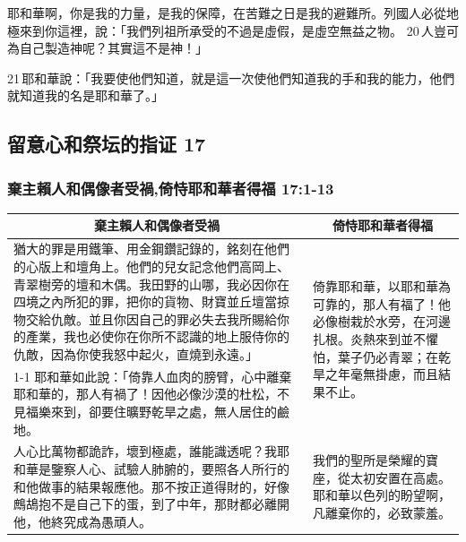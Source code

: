 耶和華啊，你是我的力量，是我的保障，在苦難之日是我的避難所。列國人必從地極來到你這裡，說：「我們列祖所承受的不過是虛假，是虛空無益之物。 20 人豈可為自己製造神呢？其實這不是神！」

21 耶和華說：「我要使他們知道，就是這一次使他們知道我的手和我的能力，他們就知道我的名是耶和華了。」


\subsection{留意心和祭坛的指证 17}
\subsubsection{棄主賴人和偶像者受禍,倚恃耶和華者得福 17:1-13}
\begin{table}[H]
\centering
\begin{tabular}{p{11.75cm}|p{5.50cm}}\hline\hline
\multicolumn{1}{c|}{棄主賴人和偶像者受禍}&\multicolumn{1}{c}{倚恃耶和華者得福}\\\hline
猶大的罪是用鐵筆、用金鋼鑽記錄的，銘刻在他們的心版上和壇角上。他們的兒女記念他們高岡上、青翠樹旁的壇和木偶。我田野的山哪，我必因你在四境之內所犯的罪，把你的貨物、財寶並丘壇當掠物交給仇敵。並且你因自己的罪必失去我所賜給你的產業，我也必使你在你所不認識的地上服侍你的仇敵，因為你使我怒中起火，直燒到永遠。」
&\multirow{2}{5.6cm}{倚靠耶和華，以耶和華為可靠的，那人有福了！他必像樹栽於水旁，在河邊扎根。炎熱來到並不懼怕，葉子仍必青翠；在乾旱之年毫無掛慮，而且結果不止。}\\\cline{1-1}
耶和華如此說：「倚靠人血肉的膀臂，心中離棄耶和華的，那人有禍了！因他必像沙漠的杜松，不見福樂來到，卻要住曠野乾旱之處，無人居住的鹼地。&\\\hline

人心比萬物都詭詐，壞到極處，誰能識透呢？我耶和華是鑒察人心、試驗人肺腑的，要照各人所行的和他做事的結果報應他。那不按正道得財的，好像鷓鴣抱不是自己下的蛋，到了中年，那財都必離開他，他終究成為愚頑人。
&我們的聖所是榮耀的寶座，從太初安置在高處。耶和華以色列的盼望啊，凡離棄你的，必致蒙羞。\\\hline
\end{tabular}
\end{table}


